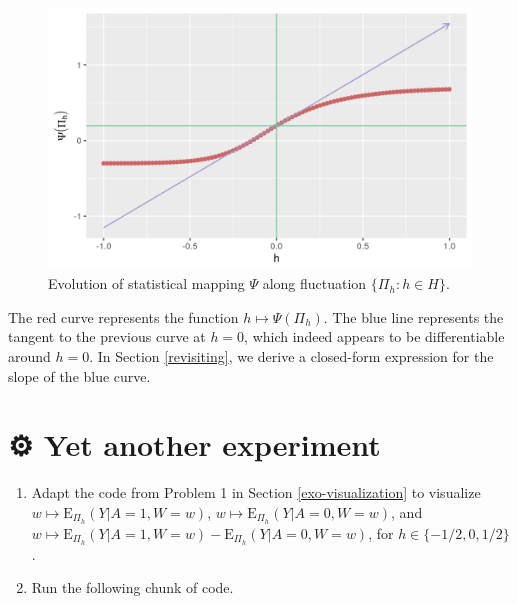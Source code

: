 \documentclass[
  11pt,
  openright,twoside]{book}
\newcommand{\gear}{\usebox{\gearbox}\;}
\newcommand{\Exp}{\textrm{E}}
\theoremstyle{definition}
\theoremstyle{definition}
\theoremstyle{definition}
\theoremstyle{definition}
\theoremstyle{remark}
\begin{document}
\begin{figure}

{\centering \includegraphics[width=0.7\linewidth]{img/psi-approx-psi-one-1} 

}

\caption{Evolution of statistical mapping \(\Psi\) along fluctuation \(\{\Pi_{h} : h \in H\}\).}\label{fig:psi-approx-psi-one}
\end{figure}

The red curve represents the function \(h \mapsto \Psi(\Pi_{h})\). The blue line
represents the tangent to the previous curve at \(h=0\), which indeed appears to
be differentiable around \(h=0\). In Section \ref{revisiting}, we derive a
closed-form expression for the slope of the blue curve.

\hypertarget{exo-yet-another-experiment}{%
\section{\texorpdfstring{⚙ \gear Yet another experiment}{⚙ Yet another experiment}}\label{exo-yet-another-experiment}}

\begin{enumerate}
\def\labelenumi{\arabic{enumi}.}
\item
  Adapt the code from Problem 1 in Section \ref{exo-visualization} to
  visualize \(w \mapsto \Exp_{\Pi_h}(Y | A = 1, W = w)\), \(w \mapsto \Exp_{\Pi_h}(Y | A = 0, W=w)\), and \(w \mapsto \Exp_{\Pi_h}(Y | A = 1, W=w) - \Exp_{\Pi_h}(Y | A = 0, W=w)\), for \(h \in \{-1/2, 0, 1/2\}\).
\item
  Run the following chunk of code.
\end{enumerate}
\end{document}
